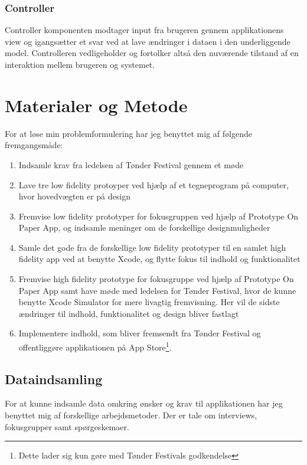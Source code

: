 \documentclass[a4paper,10pt,titlepage]{article}
\begin{document}
\subsubsection*{Controller}
Controller komponenten modtager input fra brugeren gennem applikationens view og igangsætter et svar ved at lave ændringer i dataen i den underliggende model. Controlleren vedligeholder og fortolker altså den nuværende tilstand af en interaktion mellem brugeren og systemet.\parencite[side 208]{MVC}

\section{Materialer og Metode}
For at løse min problemformulering har jeg benyttet mig af følgende fremgangsmåde:
\begin{enumerate}
\item
Indsamle krav fra ledelsen af Tønder Festival gennem et møde
\item
Lave tre low fidelity protoyper ved hjælp af et tegneprogram på computer, hvor hovedvægten er på design
\item
Fremvise low fidelity prototyper for fokusgruppen ved hjælp af Prototype On Paper App, og indsamle meninger om de forskellige designmuligheder
\item
Samle det gode fra de forskellige low fidelity prototyper til en samlet high fidelity app ved at benytte Xcode, og flytte fokus til indhold og funktionalitet
\item
Fremvise high fidelity prototype for fokusgruppe ved hjælp af Prototype On Paper App samt have møde med ledelsen for Tønder Festival, hvor de kunne benytte Xcode Simulator for mere livagtig fremvisning. Her vil de sidste ændringer til indhold, funktionalitet og design bliver fastlagt
\item
Implementere indhold, som bliver fremsendt fra Tønder Festival og offentliggøre applikationen på App Store\footnote{Dette lader sig kun gøre med Tønder Festivals godkendelse}.
\end{enumerate}
\subsection{Dataindsamling}
For at kunne indsamle data omkring ønsker og krav til applikationen har jeg benyttet mig af forskellige arbejdsmetoder. Der er tale om interviews, fokusgrupper samt spørgeskemaer.
\end{document}
